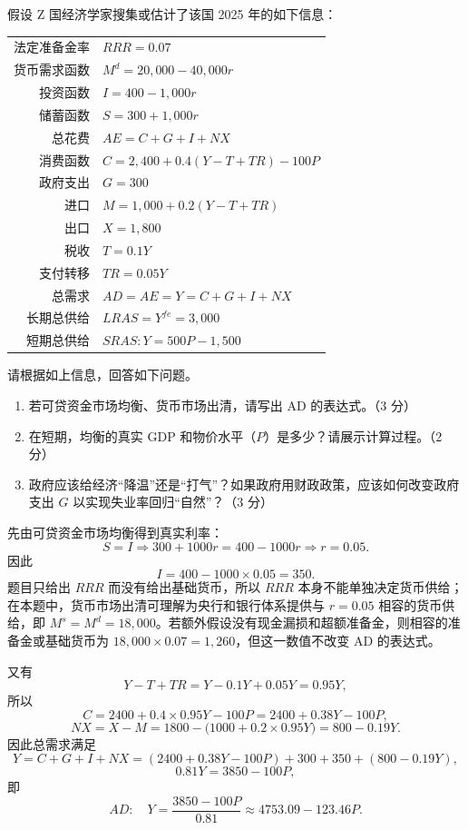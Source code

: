 \begin{question}
假设 Z 国经济学家搜集或估计了该国 2025 年的如下信息：
\begin{center}
\begin{tabular}{rl}
法定准备金率 & $RRR=0.07$\\
货币需求函数 & $M^d=20{,}000-40{,}000r$\\
投资函数 & $I=400-1{,}000r$\\
储蓄函数 & $S=300+1{,}000r$\\
总花费 & $AE=C+G+I+NX$\\
消费函数 & $C=2{,}400+0.4(Y-T+TR)-100P$\\
政府支出 & $G=300$\\
进口 & $M=1{,}000+0.2(Y-T+TR)$\\
出口 & $X=1{,}800$\\
税收 & $T=0.1Y$\\
支付转移 & $TR=0.05Y$\\
总需求 & $AD=AE=Y=C+G+I+NX$\\
长期总供给 & $LRAS=Y^{fe}=3{,}000$\\
短期总供给 & $SRAS: Y=500P-1{,}500$\\
\end{tabular}
\end{center}
请根据如上信息，回答如下问题。
\begin{enumerate}[label=(\alph*),leftmargin=2.5em]
  \item 若可贷资金市场均衡、货币市场出清，请写出 AD 的表达式。（3 分）
  \item 在短期，均衡的真实 GDP 和物价水平（$P$）是多少？请展示计算过程。（2 分）
  \item 政府应该给经济“降温”还是“打气”？如果政府用财政政策，应该如何改变政府支出 $G$ 以实现失业率回归“自然”？（3 分）
\end{enumerate}
\begin{solution}
先由可贷资金市场均衡得到真实利率：
\[
S=I\Rightarrow 300+1000r=400-1000r\Rightarrow r=0.05.
\]
因此
\[
I=400-1000\times 0.05=350.
\]
题目只给出 $RRR$ 而没有给出基础货币，所以 $RRR$ 本身不能单独决定货币供给；在本题中，货币市场出清可理解为央行和银行体系提供与 $r=0.05$ 相容的货币供给，即 $M^s=M^d=18,000$。若额外假设没有现金漏损和超额准备金，则相容的准备金或基础货币为 $18,000\times 0.07=1,260$，但这一数值不改变 AD 的表达式。

又有
\[
Y-T+TR=Y-0.1Y+0.05Y=0.95Y,
\]
所以
\[
C=2400+0.4\times 0.95Y-100P=2400+0.38Y-100P,
\]
\[
NX=X-M=1800-\bigl(1000+0.2\times 0.95Y\bigr)=800-0.19Y.
\]
因此总需求满足
\[
Y=C+G+I+NX=(2400+0.38Y-100P)+300+350+(800-0.19Y),
\]
\[
0.81Y=3850-100P,
\]
即
\[
AD:\quad Y=\frac{3850-100P}{0.81}\approx 4753.09-123.46P.
\]


\end{solution}
\end{question}
